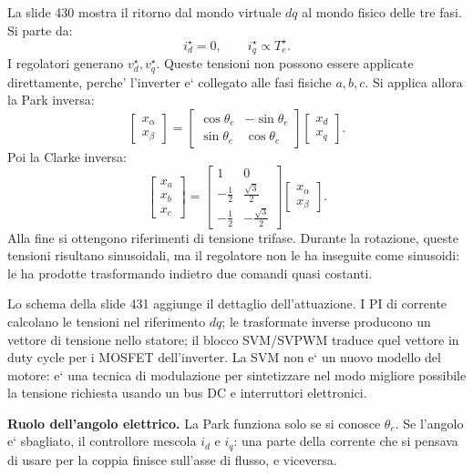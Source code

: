 \documentclass[11pt,a4paper]{article}
\begin{document}
La slide 430 mostra il ritorno dal mondo virtuale \(dq\) al mondo fisico delle tre fasi. Si parte da:
\[
i_d^\star=0,
\qquad
i_q^\star\propto T_e^\star.
\]
I regolatori generano \(v_d^\star,v_q^\star\). Queste tensioni non possono essere applicate direttamente, perche' l'inverter e` collegato alle fasi fisiche \(a,b,c\). Si applica allora la Park inversa:
\[
\begin{bmatrix}
x_\alpha\\[0.2em]
x_\beta
\end{bmatrix}
=
\begin{bmatrix}
\cos\theta_e & -\sin\theta_e\\[0.2em]
\sin\theta_e & \cos\theta_e
\end{bmatrix}
\begin{bmatrix}
x_d\\[0.2em]
x_q
\end{bmatrix}.
\]
Poi la Clarke inversa:
\[
\begin{bmatrix}
x_a\\[0.2em]
x_b\\[0.2em]
x_c
\end{bmatrix}
=
\begin{bmatrix}
1 & 0\\[0.2em]
-\frac{1}{2} & \frac{\sqrt 3}{2}\\[0.2em]
-\frac{1}{2} & -\frac{\sqrt 3}{2}
\end{bmatrix}
\begin{bmatrix}
x_\alpha\\[0.2em]
x_\beta
\end{bmatrix}.
\]
Alla fine si ottengono riferimenti di tensione trifase. Durante la rotazione, queste tensioni risultano sinusoidali, ma il regolatore non le ha inseguite come sinusoidi: le ha prodotte trasformando indietro due comandi quasi costanti.

Lo schema della slide 431 aggiunge il dettaglio dell'attuazione. I PI di corrente calcolano le tensioni nel riferimento \(dq\); le trasformate inverse producono un vettore di tensione nello statore; il blocco SVM/SVPWM traduce quel vettore in duty cycle per i MOSFET dell'inverter. La SVM non e` un nuovo modello del motore: e` una tecnica di modulazione per sintetizzare nel modo migliore possibile la tensione richiesta usando un bus DC e interruttori elettronici.

\begin{infobox}
\textbf{Ruolo dell'angolo elettrico.} La Park funziona solo se si conosce \(\theta_e\). Se l'angolo e` sbagliato, il controllore mescola \(i_d\) e \(i_q\): una parte della corrente che si pensava di usare per la coppia finisce sull'asse di flusso, e viceversa.
\end{infobox}
\end{document}
